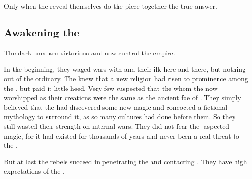 Only when the \resphain{} reveal themselves do the \dragons{} piece together the true answer.   









\subsection{Awakening the \banelords}
The dark ones are victorious and now control the \resphan{} empire. 

In the beginning, they waged wars with \dragons{} and their ilk here and there, but nothing out of the ordinary. The \dragons{} knew that a new religion had risen to prominence among the \resphain, but paid it little heed. Very few \dragons{} suspected that the \quo\banes{} whom the \resphain{} now worshipped as their creations were the same as the ancient foe of \dragonkind. They simply believed that the \resphain{} had discovered some new magic and concocted a fictional mythology to surround it, as so many cultures had done before them. So they still wasted their strength on internal wars. They did not fear the \Nyx-aspected magic, for it had existed for thousands of years and never been a real threat to the \dragons. 

But at last the rebels succeed in penetrating the  and contacting \Daggerrain. They have high expectations of the \banes{}. 

